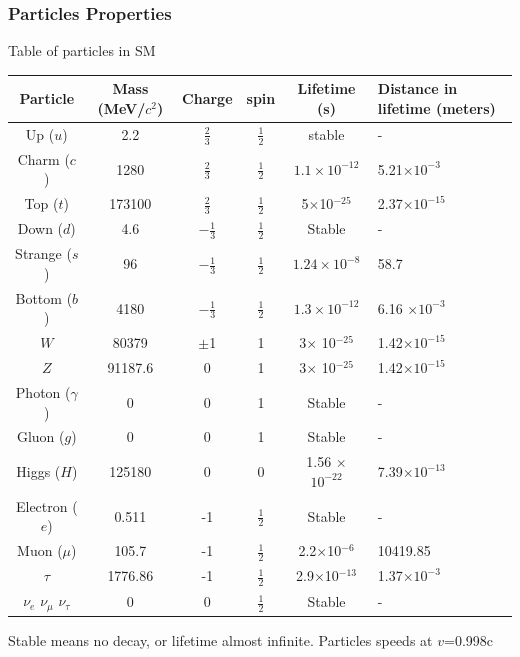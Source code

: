 \documentclass[11pt]{beamer}
\begin{document}
\begin{frame}
\frametitle{Particles Properties}
Table of particles in SM
\begin{table}
\tiny{\renewcommand{\arraystretch}{1.5}
\begin{tabular}{|c|c|c|c|c|p{2.5cm}|}
\hline 	
Particle	& Mass (MeV/$c^2$) &Charge & spin &Lifetime (s) & Distance in lifetime (meters) \\ 
\hline 
Up ($u$)	& 2.2 & $\frac{2}{3}$ & $\frac{1}{2}$ & stable & -\\ 
\hline 	
Charm ($c$)	& 1280 &$\frac{2}{3}$ & $\frac{1}{2}$ & $ 1.1 \times 10^{-12}$ & 5.21$\times 10^{-3}$ \\ 
\hline 
Top	($t$)& 173100 & $\frac{2}{3}$ & $\frac{1}{2}$ & 5$\times$10$^{-25}$ &2.37$\times 10^{-15}$  \\ 
\hline 
Down ($d$)	& 4.6 &$-\frac{1}{3}$ & $\frac{1}{2}$ & Stable & - \\ 
\hline 
Strange ($s$)	& 96 &$-\frac{1}{3}$ & $\frac{1}{2}$ &$1.24 \times 10^{-8}$ & 58.7 \\ 
\hline 
Bottom ($b$)	& 4180 &$-\frac{1}{3}$ & $\frac{1}{2}$ &$1.3 \times 10^{-12}$  & 6.16 $\times 10^{-3}$\\ 
\hline 
$W$ 	& 80379 &$\pm$1 & 1 & 3$\times$ 10$^{-25}$ & 1.42$\times 10^{-15}$\\ 
\hline 
$Z$ & 91187.6 &0 & 1 & 3$\times$ 10$^{-25}$ &1.42$\times 10^{-15}$ \\ 
\hline
Photon ($\gamma$) & 0 &0 & 1&Stable & - \\ 
\hline
Gluon ($g$)	& 0 &0 & 1&Stable & - \\ 
\hline 
Higgs ($H$)	& 125180 &0 & 0& 1.56 $\times$ $10^{-22}$ & 7.39$\times 10^{-13}$ \\ 
\hline 
Electron ($e$)& 0.511 & -1 &  $\frac{1}{2}$& Stable & - \\ 
\hline 
Muon ($\mu$)	& 105.7 & -1 & $\frac{1}{2}$ & 2.2$\times$10$^{-6}$ & 10419.85 \\ 
\hline 
$\tau$	& 1776.86 &-1 & $\frac{1}{2}$ & 2.9$\times$10$^{-13}$ & 1.37$\times 10^{-3}$\\ 	
\hline 
$\nu_e$	$\nu_\mu$ $\nu_\tau$& 0 & 0 & $\frac{1}{2}$ & Stable & -\\
\hline 
\end{tabular} 
}
\end{table}
\tiny{Stable means no decay, or lifetime almost infinite. Particles speeds at $v$=0.998c}
\end{frame}
\end{document}
